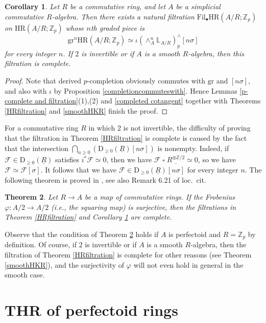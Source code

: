 \documentclass[10pt]{amsart}
\newtheorem{thm}{Theorem}[section]
\newtheorem{cor}[thm]{Corollary}
\theoremstyle{definition}
\numberwithin{equation}{section}
\renewcommand{\L}{\mathbb{L}}
\newcommand{\Z}{\mathbb{Z}}
\newcommand{\cF}{\mathcal{F}}
\newcommand{\rD}{\mathrm{D}}
\newcommand{\ul}{\underline}
\newcommand{\gr}{\mathrm{gr}}
\newcommand{\Fil}{\mathrm{Fil}}
\DeclareMathOperator{\sotimes}{\square}
\newcommand{\HR}{\mathrm{HR}}
\begin{document}
\begin{cor}
\label{complete HRfiltration}
Let $R$ be a commutative ring,
and let $A$ be a simplicial commutative $R$-algebra.
Then there exists a natural filtration $\Fil_\bullet \HR(A/R;\Z_p)$ on $\HR(A/R;\Z_p)$ whose $n$th graded piece is
\[
\gr^n \HR(A/R;\Z_p)
\simeq
\iota (\wedge_{A}^n  \L_{A/R})_p^\wedge [n\sigma]
\]
for every integer $n$.
If $2$ is invertible or if $A$ is a smooth $R$-algebra, 
then this filtration is complete.
\end{cor}
\begin{proof}
Note that derived $p$-completion obviously
commutes with $\gr$ and $[n\sigma]$, and also with $\iota$ by Proposition \ref{completioncommuteswith}.
Hence Lemmas \ref{p-complete and filtration}(1),(2) and
\ref{completed cotangent} together with Theorems \ref{HRfiltration} and \ref{smoothHKR} finish the proof.
\end{proof}

For a commutative ring $R$ in which $2$ is not invertible,
the difficulty of proving that the filtration in Theorem \ref{HRfiltration} is complete is caused by the fact that the intersection $\bigcap_{n\geq 0} (\rD_{\geq 0}(\ul{R})[n\sigma])$ is nonempty.
Indeed, if $\cF\in \rD_{\geq 0}(\ul{R})$ satisfies $i^*\cF\simeq 0$,
then we have $\cF\sotimes \ul{R^{\oplus \Z/2}}\simeq 0$,
so we have $\cF\simeq \cF[\sigma]$.
It follows that we have $\cF\in \rD_{\geq 0}(\ul{R})[n\sigma]$ for every integer $n$.
The following theorem is proved in \cite[Theorem 6.20]{Par23}, 
see also Remark 6.21 of loc.\ cit.

\begin{thm}
\label{conjHKR}
Let $R\to A$ be a map of commutative rings.
If the Frobenius $\varphi\colon A/2\to A/2$ (i.e., the squaring map) is surjective,
then the filtrations in Theorem \ref{HRfiltration} and Corollary \ref{complete HRfiltration} are complete.
\end{thm}

Observe that the condition of Theorem \ref{conjHKR} holds if $A$ is perfectoid and $R=\Z_p$ by definition.
Of course, 
if $2$ is invertible or if $A$ is a smooth $R$-algebra,
then the filtration of Theorem \ref{HRfiltration} is complete for other reasons (see Theorem \ref{smoothHKR}), and the surjectivity of $\varphi$ will not even hold in general in the smooth case.





\section{THR of perfectoid rings}
\label{sec5}
\end{document}
